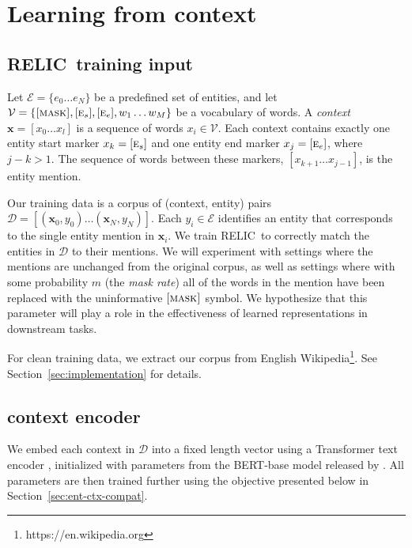 \documentclass{article} \usepackage{iclr2020_conference,times}
\newcommand{\blank}{\textsc{[mask]}}
\newcommand{\ctx}{\mathbf{x}}
\newcommand{\ack}{RELIC\xspace}
\begin{document}
%
 
\section{Learning from context}\label{sec:learning_setup}

\newcommand{\entstart}{[\textsc{e}_s]}
\newcommand{\entend}{[\textsc{e}_e]}

\subsection{\ack~training input}
Let $\mathcal{E} = \{e_0 \dots e_N\}$ be a predefined set of entities, and let $\mathcal{V} = \{\blank, \entstart, \entend, w_1 \dots w_M\}$ be a vocabulary of words.
A \emph{context} $\ctx = [x_0 \dots  x_l]$ is a sequence of words $x_i \in \mathcal{V}$. 
Each context contains exactly one entity start marker $x_k = \entstart$ and one entity end marker $x_j = \entend$, where $j - k > 1$. 
The sequence of words between these markers, $[x_{k+1} \dots x_{j-1}]$, is the entity mention. 

Our training data is a corpus of (context, entity) pairs $\mathcal{D} = \left[(\ctx_0, y_0)\dots (\ctx_N, y_N)\right]$.
Each $y_i \in \mathcal{E}$ identifies an entity that corresponds to the single entity mention in $\ctx_i$. 
We train \ack~to correctly match the entities in $\mathcal{D}$ to their mentions.
We will experiment with settings where the mentions are unchanged from the original corpus, as well as settings where with some probability $m$ (the \textit{mask rate}) all of the words in the mention have been replaced with the uninformative $\blank$ symbol. We hypothesize that this parameter will play a role in the effectiveness of learned representations in downstream tasks.

For clean training data, we extract our corpus from English Wikipedia\footnote{https://en.wikipedia.org}. See Section~\ref{sec:implementation} for details.

\subsection{context encoder}
We embed each context in $\mathcal{D}$ into a fixed length vector using a Transformer text encoder \citep{vaswani2017attention}, initialized with parameters from the BERT-base model released by \citealt{devlin2018bert}.
All parameters are then trained further using the objective presented below in Section~\ref{sec:ent-ctx-compat}.
\end{document}
